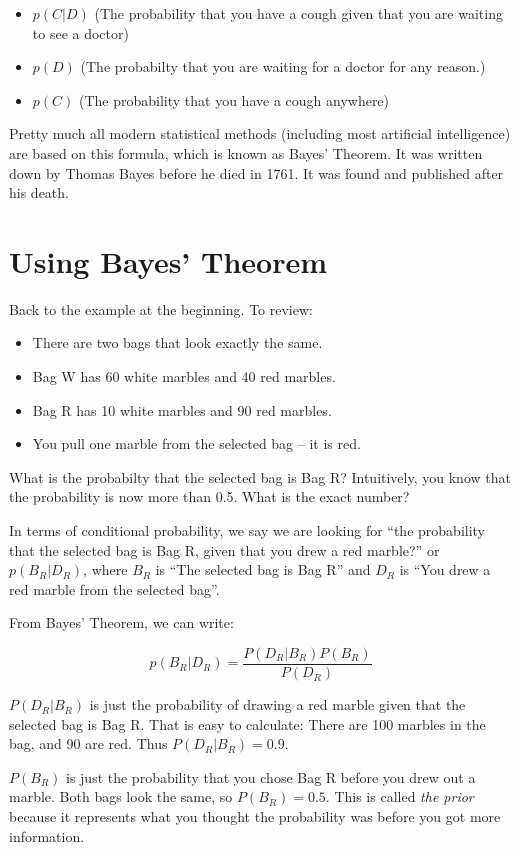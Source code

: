 \begin{itemize}
\item $p(C | D)$ (The probability that you have a cough given that you are waiting to see a doctor)
\item $p(D)$ (The probabilty that you are waiting for a doctor for any reason.)
\item $p(C)$ (The probability that you have a cough anywhere)
\end{itemize}

Pretty much all modern statistical methods (including most artificial
intelligence) are based on this formula, which is known as Bayes'
Theorem.  It was written down by Thomas Bayes before he died in
1761. It was found and published after his death.

\section{Using Bayes' Theorem}

Back to the example at the beginning. To review:

\begin{itemize}
\item There are two bags that look exactly the same.
\item Bag W has 60 white marbles and 40 red marbles.
\item Bag R has 10 white marbles and 90 red marbles.
\item You pull one marble from the selected bag -- it is red.
\end{itemize}

What is the probabilty that the selected bag is Bag R? Intuitively,
you know that the probability is now more than 0.5. What is the exact
number?

In terms of conditional probability, we say we are looking for ``the probability
that the selected bag is Bag R, given that you drew a red marble?'' or
$p(B_R | D_R)$, where $B_R$ is ``The selected bag is Bag R'' and $D_R$ is
``You drew a red marble from the selected bag''.

From Bayes' Theorem, we can write:

$$p(B_R | D_R) = \frac{ P(D_R | B_R) P(B_R) } {P(D_R)}$$

$P(D_R | B_R)$ is just the probability of drawing a red marble given that the
selected bag is Bag R. That is easy to calculate: There are 100
marbles in the bag, and 90 are red.  Thus $P(D_R | B_R) = 0.9$.

$P(B_R)$ is just the probability that you chose Bag R before you drew
out a marble. Both bags look the same, so $P(B_R)= 0.5$.  This is
called \textit{the prior} because it represents what you thought the
probability was before you got more information.

